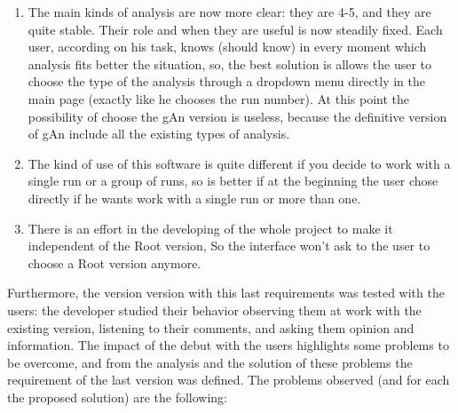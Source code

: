 \begin{enumerate}
\item 
The main kinds of analysis are now more clear: they are 4-5, and they are     quite stable. Their role and when they are useful is now steadily fixed. Each user, according on his task, knows (should know) in every moment which analysis fits better the situation, so, the best solution is allows the user to choose the type of the analysis through a dropdown menu directly in the main page (exactly like he chooses the run number). At this point the possibility of choose the gAn version is useless, because the definitive version of gAn include all the existing types of analysis. 

\item 
The kind of use of this software is quite different if you decide to work with a single run or a group of runs, so is better if at the beginning the user chose directly if he wants work with a single run or more than one. 

\item
There is an effort in the developing of the whole project to make it independent of the Root version, So the interface won't ask to the user to choose a Root version anymore.

\end{enumerate}
 
Furthermore, the version version with this last requirements was tested with the users: the developer studied their behavior observing them at work with the existing version, listening to their comments, and asking them opinion and information. The impact  of the debut with the users highlights some problems to be overcome, and from the analysis and the solution of these problems the requirement of the last version was defined. The problems observed (and for each the proposed solution) are the following:

